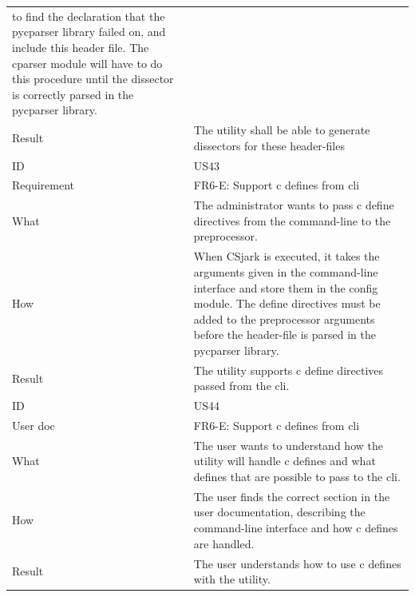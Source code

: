 \begin{table}[htbp]
{\begin{tabularx}{1.2\textwidth}{l X}
	to find the declaration that the \gls{pycparser} \gls{library} failed on, and include this \gls{header} file. The cparser module will have to do this procedure until the \gls{dissector} is correctly parsed in the \gls{pycparser} \gls{library}. \\
	Result & The \gls{utility} shall be able to generate \glspl{dissector} for these \gls{header}-files \\	
	\midrule
	ID & US43 \\
	Requirement & FR6-E: Support \Gls{c} \glspl{define} from \gls{cli}  \\
	What & The administrator wants to pass \Gls{c} \gls{define} directives from the command-line to the \gls{preprocessor}.   \\
	How & When CSjark is executed, it takes the arguments given in the command-line interface and store them in the config module.
	The \gls{define} directives must be added to the \gls{preprocessor} arguments before the \gls{header}-file is parsed in the \gls{pycparser} \gls{library}.   \\
	Result & The \gls{utility} supports \Gls{c} \gls{define} directives passed from the \gls{cli}. \\
	\midrule
	ID & US44 \\
	User doc & FR6-E: Support \Gls{c} \glspl{define} from \gls{cli} \\
	What & The user wants to understand how the \gls{utility} will handle \Gls{c} \glspl{define} and what \glspl{define} that are possible to pass to the \gls{cli}.   \\
	How & The user finds the correct section in the user documentation, describing the command-line interface and how \Gls{c} \glspl{define} are handled.  \\
	Result & The user understands how to use \Gls{c} \glspl{define} with the \gls{utility}. \\
	\bottomrule
\end{tabularx}}
\end{table}

